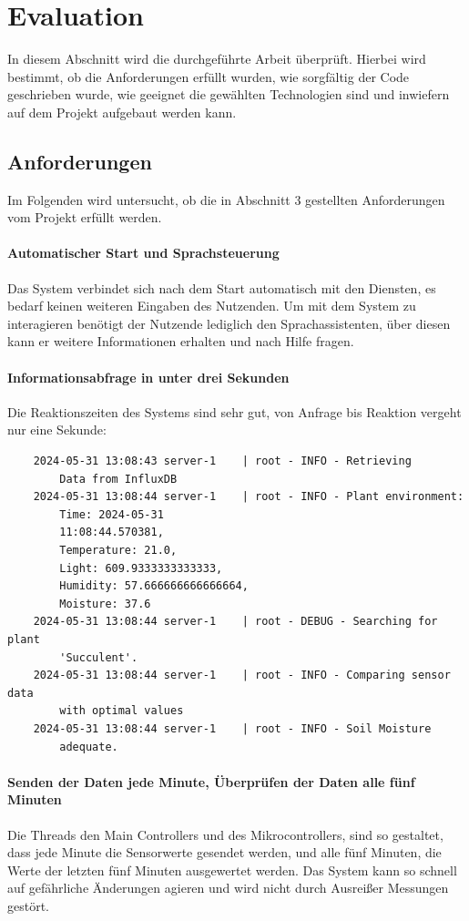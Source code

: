 \section{Evaluation} \label{sec_05}
In diesem Abschnitt wird die durchgeführte Arbeit überprüft. Hierbei wird bestimmt, ob die Anforderungen erfüllt wurden, wie sorgfältig der Code geschrieben wurde, wie geeignet die gewählten Technologien sind und inwiefern auf dem Projekt aufgebaut werden kann.

\subsection{Anforderungen}
Im Folgenden wird untersucht, ob die in Abschnitt 3 gestellten Anforderungen vom Projekt erfüllt werden.

\paragraph{Automatischer Start und Sprachsteuerung}
Das System verbindet sich nach dem Start automatisch mit den Diensten, es bedarf keinen weiteren Eingaben des Nutzenden. Um mit dem System zu interagieren benötigt der Nutzende lediglich den Sprachassistenten, über diesen kann er weitere Informationen erhalten und nach Hilfe fragen.

\paragraph{Informationsabfrage in unter drei Sekunden}
Die Reaktionszeiten des Systems sind sehr gut, von Anfrage bis Reaktion vergeht nur eine Sekunde:

\begin{verbatim}
    2024-05-31 13:08:43 server-1    | root - INFO - Retrieving
        Data from InfluxDB
    2024-05-31 13:08:44 server-1    | root - INFO - Plant environment: 
        Time: 2024-05-31 
        11:08:44.570381, 
        Temperature: 21.0, 
        Light: 609.9333333333333, 
        Humidity: 57.666666666666664, 
        Moisture: 37.6
    2024-05-31 13:08:44 server-1    | root - DEBUG - Searching for plant 
        'Succulent'.
    2024-05-31 13:08:44 server-1    | root - INFO - Comparing sensor data 
        with optimal values
    2024-05-31 13:08:44 server-1    | root - INFO - Soil Moisture
        adequate.
\end{verbatim}

\paragraph{Senden der Daten jede Minute, Überprüfen der Daten alle fünf Minuten}
Die Threads den Main Controllers und des Mikrocontrollers, sind so gestaltet, dass jede Minute die Sensorwerte gesendet werden, und alle fünf Minuten, die Werte der letzten fünf Minuten ausgewertet werden. Das System kann so schnell auf gefährliche Änderungen agieren und wird nicht durch Ausreißer Messungen gestört.

